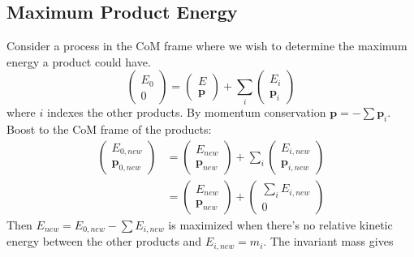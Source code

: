 \documentclass[12pt]{article}
\theoremstyle{definition}
\begin{document}
\subsection{Maximum Product Energy}
Consider a process in the CoM frame where we wish to determine the maximum energy a product could have.
\begin{equation*}
    \begin{pmatrix}
        E_0 \\ 0
    \end{pmatrix}
    =
    \begin{pmatrix}
        E \\ \bm{p}
    \end{pmatrix}
    + \sum_i
    \begin{pmatrix}
        E_i \\ \bm{p}_i
    \end{pmatrix}
\end{equation*}
where $i$ indexes the other products. By momentum conservation $\bm{p} = -\sum \bm{p}_i$. Boost to the
CoM frame of the products:
\begin{equation*}
\begin{split}
    \begin{pmatrix}
        E_{0,new} \\ \bm{p}_{0,new}
    \end{pmatrix}
        &=
            \begin{pmatrix}
                E_{new} \\ \bm{p}_{new}
            \end{pmatrix}
            + \sum_i
            \begin{pmatrix}
                E_{i,new} \\ \bm{p}_{i,new}
            \end{pmatrix} \\
        &=
             \begin{pmatrix}
                E_{new} \\ \bm{p}_{new}
            \end{pmatrix}
            +
            \begin{pmatrix}
                \sum_i E_{i,new} \\ 0
            \end{pmatrix}
\end{split}
\end{equation*}
Then $E_{new} = E_{0,new} - \sum E_{i,new}$ is maximized when there's no relative kinetic energy between the
other products and $E_{i,new} = m_i$. The invariant mass gives
\end{document}
